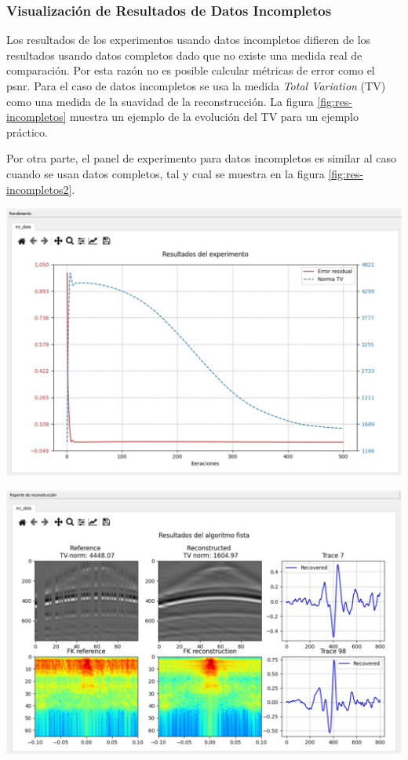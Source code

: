 \documentclass[12pt,twoside,letter]{ol-softwaremanual}
\newenvironment{Figure}
  {\par\medskip\noindent\minipage{\linewidth}}
  {\endminipage\par\medskip}
\begin{document}
\vspace{0.5cm}

\subsubsection{Visualización de Resultados de Datos Incompletos}

Los resultados de los experimentos usando datos incompletos difieren de los resultados usando datos completos dado que no existe una medida real de comparación. Por esta razón no es posible calcular métricas de error como el psnr. Para el caso de datos incompletos se usa la medida \textit{Total Variation} (TV) como una medida de la suavidad de la reconstrucción. La figura \ref{fig:res-incompletos} muestra un ejemplo de la evolución del TV para un ejemplo práctico.

Por otra parte, el panel de experimento para datos incompletos es similar al caso cuando se usan datos completos, tal y cual se muestra en la figura \ref{fig:res-incompletos2}.

\begin{Figure}
	\centering
	\includegraphics[width=0.85\linewidth]{res-incompletos}
	\label{fig:res-incompletos}
\end{Figure}

\begin{Figure}
	\centering
	\includegraphics[width=0.85\linewidth]{res-incompletos2}
	\label{fig:res-incompletos2}
\end{Figure}
\end{document}
